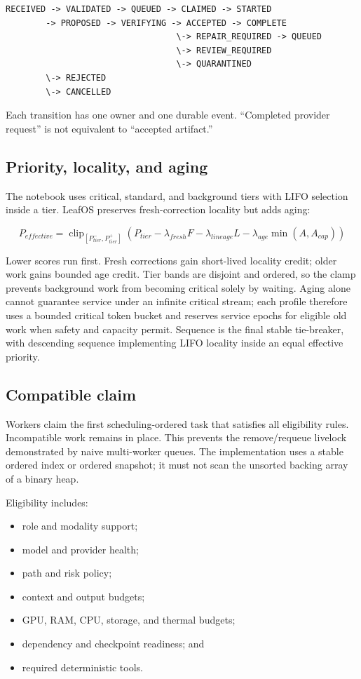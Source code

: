 \documentclass[11pt,letterpaper]{article}
\begin{document}
\begin{lstlisting}
RECEIVED -> VALIDATED -> QUEUED -> CLAIMED -> STARTED
        -> PROPOSED -> VERIFYING -> ACCEPTED -> COMPLETE
                                  \-> REPAIR_REQUIRED -> QUEUED
                                  \-> REVIEW_REQUIRED
                                  \-> QUARANTINED
        \-> REJECTED
        \-> CANCELLED
\end{lstlisting}

Each transition has one owner and one durable event. ``Completed provider
request'' is not equivalent to ``accepted artifact.''

\subsection{Priority, locality, and aging}

The notebook uses critical, standard, and background tiers with LIFO selection
inside a tier. LeafOS preserves fresh-correction locality but adds aging:

\[
P_{effective} =
\operatorname{clip}_{[P^-_{tier},P^+_{tier}]}
\left(
P_{tier}
-\lambda_{fresh}F
-\lambda_{lineage}L
-\lambda_{age}\min(A,A_{cap})
\right)
\]

Lower scores run first. Fresh corrections gain short-lived locality credit;
older work gains bounded age credit. Tier bands are disjoint and ordered, so the
clamp prevents background work from becoming critical solely by waiting. Aging
alone cannot guarantee service under an infinite critical stream; each profile
therefore uses a bounded critical token bucket and reserves service epochs for
eligible old work when safety and capacity permit. Sequence is the final stable
tie-breaker, with descending sequence implementing LIFO locality inside an equal
effective priority.

\subsection{Compatible claim}

Workers claim the first scheduling-ordered task that satisfies all eligibility
rules. Incompatible work remains in place. This prevents the remove/requeue
livelock demonstrated by naive multi-worker queues. The implementation uses a
stable ordered index or ordered snapshot; it must not scan the unsorted backing
array of a binary heap.

Eligibility includes:

\begin{itemize}
  \item role and modality support;
  \item model and provider health;
  \item path and risk policy;
  \item context and output budgets;
  \item GPU, RAM, CPU, storage, and thermal budgets;
  \item dependency and checkpoint readiness; and
  \item required deterministic tools.
\end{itemize}
\end{document}
